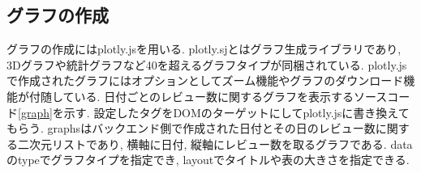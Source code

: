 
\subsection{グラフの作成}
グラフの作成にはplotly.js\cite{plotly}を用いる. plotly.sjとはグラフ生成ライブラリであり, 3Dグラフや統計グラフなど40を超えるグラフタイプが同梱されている\cite{plotly}.
plotly.jsで作成されたグラフにはオプションとしてズーム機能やグラフのダウンロード機能が付随している. 
日付ごとのレビュー数に関するグラフを表示するソースコード\ref{graph}を示す. 設定したタグをDOMのターゲットにしてplotly.jsに書き換えてもらう. graphsはバックエンド側で作成された日付とその日のレビュー数に関する二次元リストであり, 横軸に日付, 縦軸にレビュー数を取るグラフである. 
dataのtypeでグラフタイプを指定でき, layoutでタイトルや表の大きさを指定できる. 

